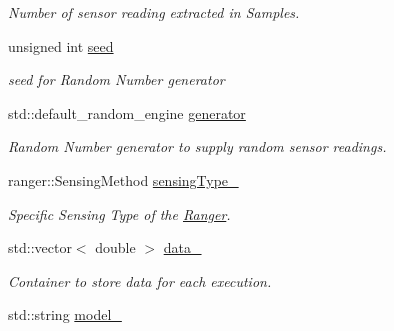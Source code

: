 \begin{DoxyCompactItemize}
\begin{DoxyCompactList}\small\item\em Number of sensor reading extracted in Samples. \end{DoxyCompactList}\item 
unsigned int \hyperlink{class_ranger_a3d56c77b50d945e89809cae1a93d0046}{seed}\hypertarget{class_ranger_a3d56c77b50d945e89809cae1a93d0046}{}\label{class_ranger_a3d56c77b50d945e89809cae1a93d0046}

\begin{DoxyCompactList}\small\item\em seed for Random Number generator \end{DoxyCompactList}\item 
std\+::default\+\_\+random\+\_\+engine \hyperlink{class_ranger_aa8678414feb7c07f6aee40d889619064}{generator}\hypertarget{class_ranger_aa8678414feb7c07f6aee40d889619064}{}\label{class_ranger_aa8678414feb7c07f6aee40d889619064}

\begin{DoxyCompactList}\small\item\em Random Number generator to supply random sensor readings. \end{DoxyCompactList}\item 
ranger\+::\+Sensing\+Method \hyperlink{class_ranger_a59c4423a891952a753560b2dc79aa3c5}{sensing\+Type\+\_\+}\hypertarget{class_ranger_a59c4423a891952a753560b2dc79aa3c5}{}\label{class_ranger_a59c4423a891952a753560b2dc79aa3c5}

\begin{DoxyCompactList}\small\item\em Specific Sensing Type of the \hyperlink{class_ranger}{Ranger}. \end{DoxyCompactList}\item 
std\+::vector$<$ double $>$ \hyperlink{class_ranger_adef7fed47f032646f5023046de0bbc48}{data\+\_\+}\hypertarget{class_ranger_adef7fed47f032646f5023046de0bbc48}{}\label{class_ranger_adef7fed47f032646f5023046de0bbc48}

\begin{DoxyCompactList}\small\item\em Container to store data for each execution. \end{DoxyCompactList}\item 
std\+::string \hyperlink{class_ranger_a806db893039467e1f6f66335e8eabb7b}{model\+\_\+}\hypertarget{class_ranger_a806db893039467e1f6f66335e8eabb7b}{}\label{class_ranger_a806db893039467e1f6f66335e8eabb7b}


\end{DoxyCompactItemize}
